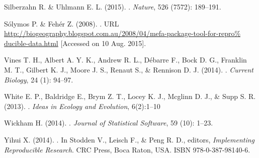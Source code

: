\documentclass[11pt,a4paper]{article}
\begin{document}
\begin{thebibliography}{30}
Silberzahn R. \& Uhlmann E. L. (2015).
.
\newblock \emph{Nature}, 526 (7572): 189--191.


S{\'{o}}lymos P. \& Feh{\'{e}}r Z. (2008).
.
\newblock URL
  \url{http://biogeography.blogspot.com.au/2008/04/mefa-package-tool-for-repro%
ducible-data.html} [Accessed on 10 Aug. 2015].

Vines T. H., Albert A. Y. K., Andrew R. L.,  D{\'{e}}barre F.,
  Bock D. G., Franklin M. T., Gilbert K. J., Moore J. S., Renaut S., \& Rennison D. J. (2014).
.
\newblock \emph{Current Biology}, 24 (1): 94--97.


White E. P., Baldridge E., Brym Z. T., Locey K. J., 
  Mcglinn D. J., \& Supp S. R. (2013).
.
\newblock \emph{Ideas in Ecology and Evolution}, 6(2):1--10


Wickham H. (2014).
.
\newblock \emph{Journal of Statistical Software}, 59 (10):
  1--23.

Yihui X. (2014).
.
\newblock In Stodden V., Leisch F., \& Peng R. D., editors, \emph{Implementing
  Reproducible Research}. CRC Press, Boca Raton, USA.
\newblock ISBN 978-0-387-98140-6.


\end{thebibliography}
\end{document}
